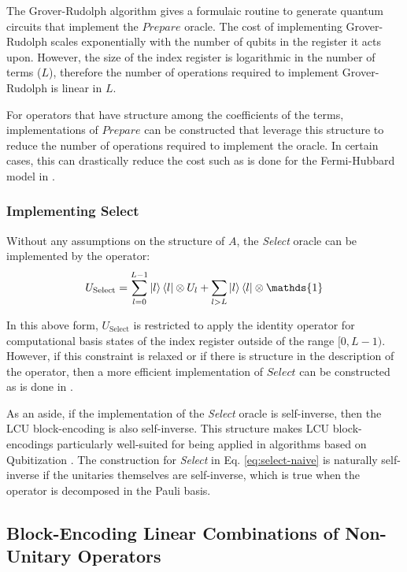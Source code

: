 The Grover-Rudolph algorithm \cite{grover2002creating} gives a formulaic routine to generate quantum circuits that implement the $\textit{Prepare}$ oracle.
The cost of implementing Grover-Rudolph scales exponentially with the number of qubits in the register it acts upon.
However, the size of the index register is logarithmic in the number of terms ($L$), therefore the number of operations required to implement Grover-Rudolph is linear in $L$.

For operators that have structure among the coefficients of the terms, implementations of $\textit{Prepare}$ can be constructed that leverage this structure to reduce the number of operations required to implement the oracle.
In certain cases, this can drastically reduce the cost such as is done for the Fermi-Hubbard model in \cite{babbush2018encoding}.

\subsubsection{Implementing \textbf{Select}}

Without any assumptions on the structure of $A$, the \textit{Select} oracle can be implemented by the operator:
\begin{equation}
    \label{eq:select-naive}
    U_\text{Select} = \sum_{l=0}^{L-1} \ket{l}\bra{l} \otimes U_l + \sum_{l>L} \ket{l}\bra{l} \otimes \mathds{1}
\end{equation}

In this above form, $U_\text{Select}$ is restricted to apply the identity operator for computational basis states of the index register outside of the range $[0, L-1)$.
However, if this constraint is relaxed or if there is structure in the description of the operator, then a more efficient implementation of $\textit{Select}$ can be constructed as is done in \cite{babbush2018encoding}.  

As an aside, if the implementation of the \textit{Select} oracle is self-inverse, then the LCU block-encoding is also self-inverse.
This structure makes LCU block-encodings particularly well-suited for being applied in algorithms based on Qubitization \cite{low2019hamiltonian}.
The construction for \textit{Select} in Eq. \ref{eq:select-naive} is naturally self-inverse if the unitaries themselves are self-inverse, which is true when the operator is decomposed in the Pauli basis.

\subsection{Block-Encoding Linear Combinations of Non-Unitary Operators}
\label{subsec:lco}

